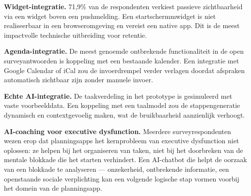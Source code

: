 \textbf{Widget-integratie.} 71,9\% van de respondenten verkiest passieve
zichtbaarheid via een widget boven een pushmelding. Een startschermmwidget is
niet realiseerbaar in een browseromgeving en vereist een native app. Dit is de
meest impactvolle technische uitbreiding voor retentie.

\textbf{Agenda-integratie.} De meest genoemde ontbrekende functionaliteit in de
open surveyantwoorden is koppeling met een bestaande kalender. Een integratie
met Google Calendar of iCal zou de invoerdrempel verder verlagen doordat
afspraken automatisch zichtbaar zijn zonder manuele invoer.

\textbf{Echte AI-integratie.} De taakverdeling in het prototype is gesimuleerd
met vaste voorbeelddata. Een koppeling met een taalmodel zou de stappengeneratie
dynamisch en contextgevoelig maken, wat de bruikbaarheid aanzienlijk verhoogt.


\textbf{AI-coaching voor executive dysfunction.} Meerdere surveyrespondenten
wezen erop dat planningsapps het kernprobleem van executive dysfunction niet
oplossen: ze helpen bij het organiseren van taken, niet bij het doorbreken van
de mentale blokkade die het starten verhindert. Een AI-chatbot die helpt de
oorzaak van een blokkade te analyseren — onzekerheid, ontbrekende informatie,
een openstaande sociale verplichting kan een volgende logische stap vormen voorbij
het domein van de planningsapp.


